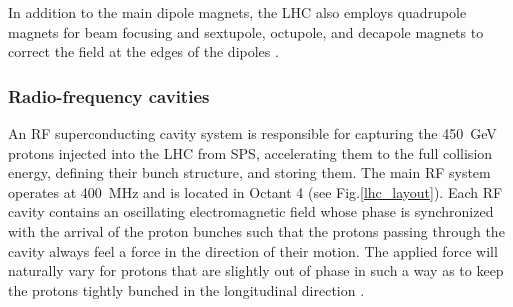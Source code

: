 In addition to the main dipole magnets, the LHC also employs quadrupole magnets for beam focusing and sextupole, octupole, and decapole magnets to correct the field at the edges of the dipoles \cite{lhc_machine}.



\subsubsection{Radio-frequency cavities}
An RF superconducting cavity system is responsible for capturing the \SI{450}{\GeV} protons injected into the LHC from SPS, accelerating them to the full collision energy, defining their bunch structure, and storing them. The main RF system operates at \SI{400}{\MHz} and is located in Octant 4 (see Fig.\ref{lhc_layout}). Each RF cavity contains an oscillating electromagnetic field whose phase is synchronized with the arrival of the proton bunches such that the protons passing through the cavity always feel a force in the direction of their motion. The applied force will naturally vary for protons that are slightly out of phase in such a way as to keep the protons tightly bunched in the longitudinal direction \cite{lhc_machine}.
